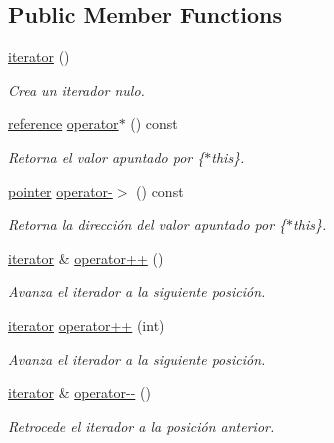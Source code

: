 \subsection*{Public Member Functions}
\begin{DoxyCompactItemize}
\item 
\hyperlink{classaed2_1_1map_1_1iterator_acdd790eb54216601a2e0591776004dba}{iterator} ()
\begin{DoxyCompactList}\small\item\em Crea un iterador nulo. \end{DoxyCompactList}\item 
\hyperlink{classaed2_1_1map_1_1iterator_ac19788914a3110897e44c53f1318f6af}{reference} \hyperlink{classaed2_1_1map_1_1iterator_ab115711d0295146906830840590d900a}{operator$\ast$} () const
\begin{DoxyCompactList}\small\item\em Retorna el valor apuntado por \{$\ast$this\}. \end{DoxyCompactList}\item 
\hyperlink{classaed2_1_1map_1_1iterator_a52ea7bdbf1dc6b252aec76633564bdf5}{pointer} \hyperlink{classaed2_1_1map_1_1iterator_a712522d62f461c1eb9b02ecf248bae8c}{operator-\/$>$} () const
\begin{DoxyCompactList}\small\item\em Retorna la dirección del valor apuntado por \{$\ast$this\}. \end{DoxyCompactList}\item 
\hyperlink{classaed2_1_1map_1_1iterator}{iterator} \& \hyperlink{classaed2_1_1map_1_1iterator_a7c44de7f0508186e135ddbcfe782fec5}{operator++} ()
\begin{DoxyCompactList}\small\item\em Avanza el iterador a la siguiente posición. \end{DoxyCompactList}\item 
\hyperlink{classaed2_1_1map_1_1iterator}{iterator} \hyperlink{classaed2_1_1map_1_1iterator_af4fe5565eb478cfccd254b2ef230b974}{operator++} (int)
\begin{DoxyCompactList}\small\item\em Avanza el iterador a la siguiente posición. \end{DoxyCompactList}\item 
\hyperlink{classaed2_1_1map_1_1iterator}{iterator} \& \hyperlink{classaed2_1_1map_1_1iterator_ae7f70f71545d2a9de17b65edaaec748a}{operator-\/-\/} ()
\begin{DoxyCompactList}\small\item\em Retrocede el iterador a la posición anterior. \end{DoxyCompactList}\item 

\end{DoxyCompactItemize}
